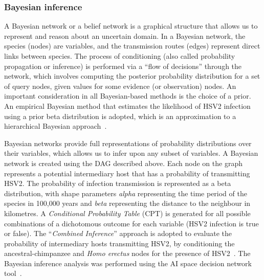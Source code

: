 \documentclass[fleqn,10pt]{wlscirep}
\begin{document}
\subsubsection*{Bayesian inference}
A Bayesian network or a belief network is a graphical structure that allows us to represent and reason about an uncertain domain. In a Bayesian network, the species (nodes) are variables, and the transmission routes (edges) represent direct links between species. The process of conditioning (also called probability propagation or inference) is performed via a ``flow of decisions'' through the network, which involves computing the posterior probability distribution for a set of query nodes, given values for some evidence (or observation) nodes. An important consideration in all Bayesian-based methods is the choice of a prior. An empirical Bayesian method that estimates the likelihood of HSV2 infection using a prior beta distribution is adopted, which is an approximation to a hierarchical Bayesian approach~\citep{Farine2015,Murphy2012}.
 
Bayesian networks provide full representations of probability distributions over their variables, which allows us to infer upon any subset of variables. A Bayesian network is created using the DAG described above. Each node on the graph represents a potential intermediary host that has a probability of transmitting HSV2. The probability of infection transmission is represented as a beta distribution, with shape parameters \textit{alpha} representing the time period of the species in 100,000 years and \textit{beta} representing the distance to the neighbour in kilometres. A \textit{Conditional Probability Table} (CPT) is generated for all possible combinations of a dichotomous outcome for each variable (HSV2 infection is true or false). The ``\textit{Combined Inference}'' approach is adopted to evaluate the probability of intermediary hosts transmitting HSV2, by conditioning the ancestral-chimpanzee and \textit{Homo erectus} nodes for the presence of HSV2~\citep{Korb2003}. The Bayesian inference analysis was performed using the AI space decision network tool~\citep{poole2010artificial}.
\end{document}
